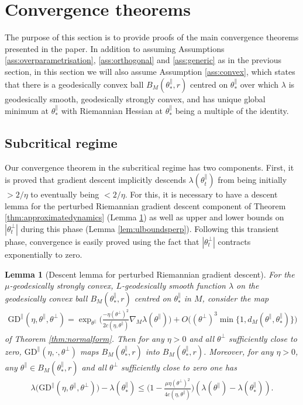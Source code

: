 \documentclass{article}
\newcommand{\tpa}{\theta^{\parallel}}
\newcommand{\tpe}{\theta^{\perp}}
\newcommand{\GD}{\mathrm{GD}}
\theoremstyle{plain}
\newtheorem{lemma}[theorem]{Lemma}
\theoremstyle{definition}
\theoremstyle{remark}
\begin{document}
\section{Convergence theorems}

The purpose of this section is to provide proofs of the main convergence theorems presented in the paper. In addition to assuming Assumptions \ref{ass:overparametrisation}, \ref{ass:orthogonal} and \ref{ass:generic} as in the previous section, in this section we will also assume Assumption \ref{ass:convex}, which states that there is a geodesically convex ball $B_M(\tpa_*,r)$ centred on $\tpa_*$ over which $\lambda$ is geodesically smooth, geodesically strongly convex, and has unique global minimum at $\tpa_*$ with Riemannian Hessian at $\tpa_*$ being a multiple of the identity.

\subsection{Subcritical regime}

Our convergence theorem in the subcritical regime has two components. First, it is proved that gradient descent implicitly descends $\lambda(\tpa_t)$ from being initially $>2/\eta$ to eventually being $<2/\eta$. For this, it is necessary to have a descent lemma for the perturbed Riemannian gradient descent component of Theorem \ref{thm:approximatedynamics} (Lemma \ref{lem:descent}) as well as upper and lower bounds on $|\tpe_t|$ during this phase (Lemma \ref{lem:ulboundsperp}). Following this transient phase, convergence is easily proved using the fact that $|\tpe_t|$ contracts exponentially to zero.

\begin{lemma}[Descent lemma for perturbed Riemannian gradient descent]\label{lem:descent}
    For the $\mu$-geodesically strongly convex, $L$-geodesically smooth function $\lambda$ on the geodesically convex ball $B_M(\tpa_*,r)$ centred on $\tpa_*$ in $M$, consider the map
    \begin{align}
        \GD^{\parallel}(\eta,\tpa,\tpe)=\exp_{\tpa}\bigg(\frac{-\eta(\tpe)^2}{2c(\eta,\tpa)}\nabla_M\lambda(\tpa)\bigg)+O\big((\tpe)^3\min\{1,d_M(\tpa,\tpa_*)\}\big)
    \end{align}
    of Theorem \ref{thm:normalform}. Then for any $\eta>0$ and all $\tpe$ sufficiently close to zero, $\GD^{\parallel}(\eta,\cdot,\tpe)$ maps $B_M(\tpa_*,r)$ into $B_M(\tpa_*,r)$. Moreover, for any $\eta>0$, any $\tpa\in B_M(\tpa_*,r)$ and all $\tpe$ sufficiently close to zero one has
    \begin{align}
        \lambda\big(\GD^{\parallel}(\eta,\tpa,\tpe)\big)-\lambda(\tpa_*)\leq \bigg(1-\frac{\mu\eta(\tpe)^2}{4c(\eta,\tpa)}\bigg)(\lambda(\tpa)-\lambda(\tpa_*)).\label{eq:descent}
    \end{align}
\end{lemma}
\end{document}
